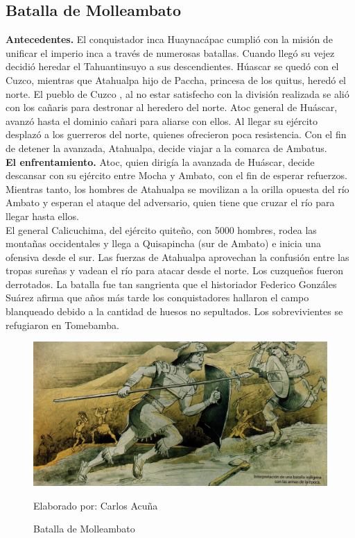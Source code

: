 \documentclass[a4paper, openright, 12pt]{report}
\begin{document}
\subsection*{Batalla de Molleambato}
\justify
\textbf{Antecedentes.} El conquistador inca Huaynacápac cumplió con la misión de unificar el imperio inca a través de numerosas batallas. Cuando llegó su vejez decidió heredar el Tahuantinsuyo a sus descendientes. Húascar se quedó con el Cuzco, mientras que Atahualpa hijo de Paccha, princesa de los quitus, heredó el norte. El pueblo de Cuzco , al no estar satisfecho con la división realizada se alió con los cañaris para destronar al heredero del norte. Atoc general de Huáscar, avanzó hasta el dominio cañari para aliarse con ellos. Al llegar su ejército desplazó a los guerreros del norte, quienes ofrecieron poca resistencia. Con el fin de detener la avanzada, Atahualpa, decide viajar a la comarca de Ambatus.\cite{2010batallas}\\  
\textbf{El enfrentamiento.} Atoc, quien dirigía la avanzada de Huáscar, decide descansar con su ejército entre Mocha y Ambato, con el fin de esperar refuerzos. Mientras tanto, los hombres de Atahualpa se movilizan a la orilla opuesta del río Ambato y esperan el ataque del adversario, quien tiene que cruzar el río para llegar hasta ellos.\\
El general Calicuchima, del ejército quiteño, con 5000 hombres, rodea las montañas occidentales y llega a Quisapincha (sur de Ambato) e inicia una ofensiva desde el sur.
Las fuerzas de Atahualpa aprovechan la confusión entre las tropas sureñas y vadean el río para atacar desde el norte. Los cuzqueños fueron derrotados. La batalla fue tan sangrienta que el historiador Federico Gonzáles Suárez afirma que años más tarde los conquistadores hallaron el campo blanqueado debido a la cantidad de huesos no sepultados. Los sobrevivientes se refugiaron en Tomebamba. \cite{2010batallas}

\begin{figure}[h]
\captionsetup{justification=centering,margin=2cm}
\includegraphics[scale=0.7]{h9}
\centering
\caption{Batalla de Molleambato}
Elaborado por: Carlos Acuña
\label{fig:h9}
\end{figure}
\clearpage
\end{document}
